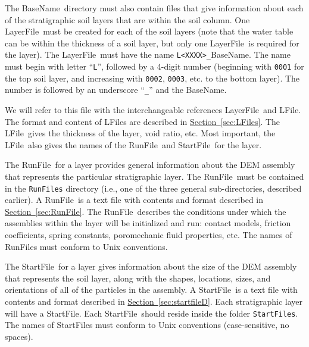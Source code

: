 \documentclass[letterpaper,11pt]{article}
\newcommand{\RunFile}{\textsf{RunFile}}
\newcommand{\StartFile}{\textsf{StartFile}}
\newcommand{\BaseName}{\textsf{BaseName}}
\newcommand{\LayerFile}{\textsf{LayerFile}}
\newcommand{\LFile}{\textsf{LFile}}
\begin{document}
\begin{enumerate}
        The \BaseName\ directory must also contain files that
        give information about each of the stratigraphic soil
        layers that are within the soil column.
        One \LayerFile\ must be created for each of the soil
        layers
        (note that the water table can be within the thickness
        of a soil layer, but only one \LayerFile\ is required
        for the layer).
        The \LayerFile\ must have the name
        \texttt{L<XXXX>\_}\BaseName.
        The name must begin with letter ``\texttt{L}'',
        followed by a 4-digit number
        (beginning with \texttt{0001} for the top soil layer,
        and increasing with \texttt{0002}, \texttt{0003}, etc.
        to the bottom layer).
        The number is followed by an underscore ``\texttt{\_}''
        and the \BaseName.
        \par
        We will refer to this file with the interchangeable
        references \LayerFile\ and \LFile.
        The format and content of \LFile s are described
        in \hyperref[sec:LFiles]{Section~\ref*{sec:LFiles}}.
        The \LFile\ gives the thickness of the layer,
        void ratio, etc.
        Most important, the \LFile\ also gives the names of the
        \RunFile\ and \StartFile\ for the layer.
        \par
        The \RunFile\ for a layer
        provides general information about the
        DEM assembly that represents the particular stratigraphic
        layer.
        The \RunFile\ must be contained in the \texttt{RunFiles}
        directory (i.e., one of the three general sub-directories,
        described earlier).
        A \RunFile\ is a text file with
        contents and format described in
        \hyperref[sec:RunFile]{Section~\ref*{sec:RunFile}}.
        The \RunFile\ describes
        the conditions under which the
        assemblies within the layer will be initialized
        and run:
        contact models,
        friction coefficients, spring constants,
        poromechanic fluid properties, etc.
        The names of \RunFile s must conform
        to Unix conventions.
        \par
        The \StartFile\ for a layer gives information
        about the size of the DEM assembly that represents
        the soil layer, along with the shapes, locations, sizes,
        and orientations of all of the particles in the assembly.
        A \StartFile\ is a text file with
        contents and format described in
        \hyperref[sec:startfileD]{Section~\ref*{sec:startfileD}}.
        Each stratigraphic layer will have a \StartFile.
        Each \StartFile\ should reside inside the
        folder \texttt{StartFiles}.
        The names of \StartFile s must conform
        to Unix conventions
        (case-sensitive, no spaces).
    \end{enumerate}
\end{document}
